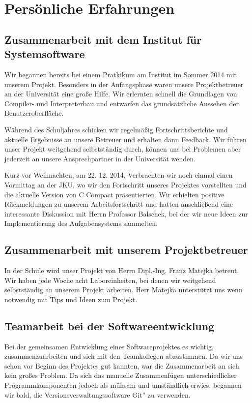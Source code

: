 

\chapter{Persönliche Erfahrungen}

\section {Zusammenarbeit mit dem Institut für Systemsoftware} \label {sec:coop-jku}
Wir begannen bereits bei einem Pratkikum am Institut im Sommer 2014 mit unserem Projekt. Besonders in der Anfangsphase waren unsere Projektbetreuer an der Universität eine große Hilfe. Wir erlernten schnell die Grundlagen von Compiler- und Interpreterbau und entwarfen das grundsätzliche Aussehen der Benutzeroberfläche.

Während des Schuljahres schicken wir regelmäßig Fortschrittsberichte und aktuelle Ergebnisse an unsere Betreuer und erhalten dann Feedback. Wir führen unser Projekt weitgehend selbstständig durch, können uns bei Problemen aber jederzeit an unsere Ansprechpartner in der Universität wenden.

Kurz vor Weihnachten, am 22. 12. 2014, Verbrachten wir noch einmal einen Vormittag an der JKU, wo wir den Fortschritt unseres Projektes vorstellten und die aktuelle Version von C Compact präsentierten. Wir erhielten positive Rückmeldungen zu unserem Arbeitsfortschritt und hatten anschließend eine interessante Diskussion mit Herrn Professor Balschek, bei der wir neue Ideen zur Implementierung des Aufgabensystems sammelten.

\section {Zusammenarbeit mit unserem Projektbetreuer}
In der Schule wird unser Projekt von Herrn Dipl.-Ing. Franz Matejka betreut. Wir haben jede Woche acht Laboreinheiten, bei denen wir weitgehend selbstständig an unserem Projekt arbeiten. Herr Matejka unterstützt uns wenn notwendig mit Tips und Ideen zum Projekt.

\section {Teamarbeit bei der Softwareentwicklung}
Bei der gemeinsamen Entwicklung eines Softwareprojektes es wichtig, zusammenzuarbeiten und sich mit den Teamkollegen abzustimmen. Da wir uns schon vor Beginn des Projektes gut kannten, war die Zusammenarbeit an sich kein großes Problem. Da sich das manuelle Zusammenfügen unterschiedlicher Programmkomponenten jedoch als mühsam und umständlich erwies, begannen wir bald, die Versionsverwaltungssoftware \glqq Git'' zu verwenden.

